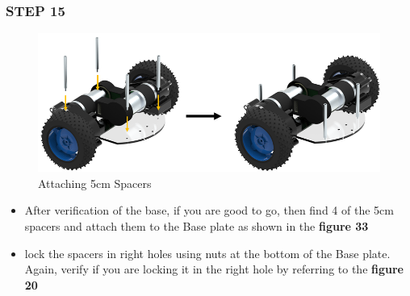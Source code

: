\documentclass[12pt,a4paper,oneside]{book}
\begin{document}
			\subsubsection*{STEP 15}
				\begin{figure}[H]
					\begin{center}
						\includegraphics[scale=0.6]{ATTACHING 5CM SPACERS}
						\caption{Attaching 5cm Spacers}
					\end{center}
				\end{figure}
				\begin{itemize}
					\item After verification of the base, if you are good to go, then find 4 of the 5cm spacers and attach them to the Base plate as shown in the \textbf{figure 33}
					\item lock the spacers in right holes using nuts at the bottom of the Base plate. Again, verify if you are locking it in the right hole by referring to the \textbf{figure 20}
				\end{itemize}
				
\end{document}
